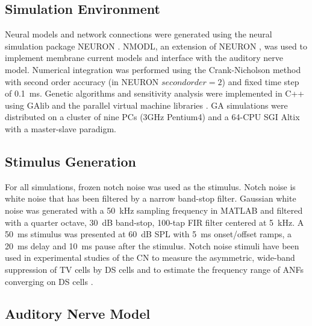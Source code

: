 \subsection{Simulation Environment}\label{sec:GA:simul-envir}

Neural models and network connections were generated using the neural
simulation package NEURON \citep{CarnevaleHines:2006}. NMODL, an
extension of NEURON \citep{HinesCarnevale:2000}, was used to implement
membrane current models and interface with the auditory nerve
model. Numerical integration was performed using the Crank-Nicholson
method with second order accuracy (in NEURON $secondorder=2$) and
fixed time step of 0.1~ms. Genetic algorithms and sensitivity analysis
were implemented in C++ using GAlib \citep{Wall:2006} and the parallel
virtual machine libraries \citep{GeistBeguelinEtAl:1994}. GA
simulations were distributed on a cluster of nine PCs (3GHz Pentium4)
and a 64-CPU SGI Altix with a master-slave paradigm.

\subsection{Stimulus Generation}\label{sec:GA:stimulus-generation}

For all simulations, frozen notch noise was used as the
stimulus. Notch noise is white noise that has been filtered by a
narrow band-stop filter. Gaussian white noise was generated with a
50~kHz sampling frequency in MATLAB and filtered with a quarter
octave, 30~dB band-stop, 100-tap FIR filter centered at 5~kHz. A 50~ms
stimulus was presented at 60~dB SPL with 5~ms onset/offset ramps, a
20~ms delay and 10~ms pause after the stimulus. Notch noise stimuli
have been used in experimental studies of the CN to measure the
asymmetric, wide-band suppression of TV cells by DS cells
\citep{ReissYoung:2005} and to estimate the frequency range of ANFs
converging on DS cells \citep{PalmerJiangEtAl:1996}.

\subsection{Auditory Nerve Model}\label{sec:GA:auditory-nerve-model}

